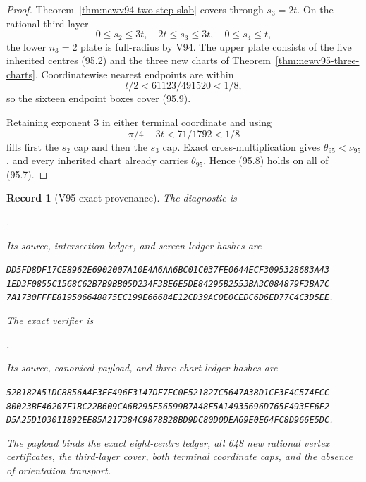 \documentclass[11pt,oneside]{article}
\newtheorem{record}[theorem]{Record}
\theoremstyle{definition}
\theoremstyle{remark}
\begin{document}
\begin{proof}
Theorem~\ref{thm:newv94-two-step-slab} covers through \(s_3=2t\).
On the rational third layer
\[
 0\leq s_2\leq3t,\quad2t\leq s_3\leq3t,\quad
 0\leq s_4\leq t,                                    \tag{95.9}
\]
the lower \(n_3=2\) plate is full-radius by V94.  The upper plate
consists of the five inherited centres (95.2) and the three new
charts of Theorem~\ref{thm:newv95-three-charts}.  Coordinatewise
nearest endpoints are within
\[
 t/2<61123/491520<1/8,                              \tag{95.10}
\]
so the sixteen endpoint boxes cover (95.9).

Retaining exponent \(3\) in either terminal coordinate and using
\[
 \pi/4-3t<71/1792<1/8                               \tag{95.11}
\]
fills first the \(s_2\) cap and then the \(s_3\) cap.  Exact
cross-multiplication gives \(\theta_{95}<\nu_{95}\), and every
inherited chart already carries \(\theta_{95}\).  Hence (95.8)
holds on all of (95.7).
\end{proof}

\begin{record}[V95 exact provenance]
\label{rec:newv95-provenance}
The diagnostic is
\begin{center}\footnotesize
{}.
\end{center}
Its source, intersection-ledger, and screen-ledger hashes are
\begin{center}\scriptsize
\texttt{DD5FD8DF17CE8962E6902007A10E4A6AA6BC01C037FE0644ECF3095328683A43}\\
\texttt{1ED3F0855C1568C62B7B9BB05D234F3BE6E5DE84295B2553BA3C084879F3BA7C}\\
\texttt{7A1730FFFE819506648875EC199E66684E12CD39AC0E0CEDC6D6ED77C4C3D5EE}.
\end{center}
The exact verifier is
\begin{center}\footnotesize
{}.
\end{center}
Its source, canonical-payload, and three-chart-ledger hashes are
\begin{center}\scriptsize
\texttt{52B182A51DC8856A4F3EE496F3147DF7EC0F521827C5647A38D1CF3F4C574ECC}\\
\texttt{80023BE46207F1BC22B609CA6B295F56599B7A48F5A14935696D765F493EF6F2}\\
\texttt{D5A25D103011892EE85A217384C9878B28BD9DC80D0DEA69E0E64FC8D966E5DC}.
\end{center}
The payload binds the exact eight-centre ledger, all 648 new
rational vertex certificates, the third-layer cover, both terminal
coordinate caps, and the absence of orientation transport.
\end{record}
\end{document}
